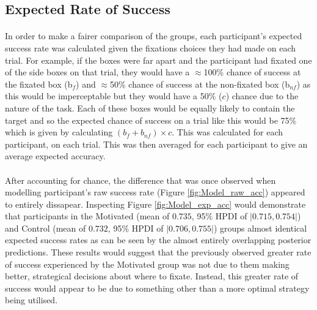 \documentclass[12pt]{article}
\begin{document}
\subsection*{Expected Rate of Success}
\paragraph{} In order to make a fairer comparison of the groups, each participant's expected success rate was calculated given the fixations choices they had made on each trial. For example, if the boxes were far apart and the participant had fixated one of the side boxes on that trial, they would have a $\approx$100\% chance of success at the fixated box (b$_f$) and $\approx$50\% chance of success at the non-fixated box (b$_{nf}$) as this would be imperceptable but they would have a 50\% ($c$) chance due to the nature of the task. Each of these boxes would be equally likely to contain the target and so the expected chance of success on a trial like this would be 75\% which is given by calculating $(b_f + b_{nf})\times c$. This was calculated for each participant, on each trial. This was then averaged for each participant to give an average expected accuracy. 

\paragraph{} After accounting for chance, the difference that was once observed when modelling participant's raw success rate (Figure \ref{fig:Model_raw_acc}) appeared to entirely dissapear. Inspecting Figure \ref{fig:Model_exp_acc} would demonstrate that participants in the Motivated (mean of $0.735$, 95\% HPDI of $|0.715, 0.754|$) and Control (mean of $0.732$, 95\% HPDI of $|0.706, 0.755|$) groups almost identical expected success rates as can be seen by the almost entirely overlapping posterior predictions. These results would suggest that the previously observed greater rate of success experienced by the Motivated group was not due to them making better, strategical decisions about where to fixate. Instead, this greater rate of success would appear to be due to something other than a more optimal strategy being utilised. 
\end{document}
